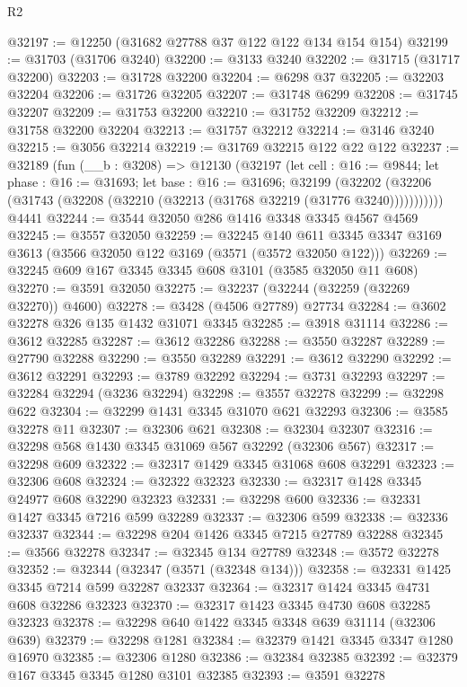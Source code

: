 \begin{lexlean}{R2}
\begin{coremodule}
@32197 := @12250 (@31682 @27788 @37 @122 @122 @134 @154 @154)
@32199 := @31703 (@31706 @3240)
@32200 := @3133 @3240
@32202 := @31715 (@31717 @32200)
@32203 := @31728 @32200
@32204 := @6298 @37
@32205 := @32203 @32204
@32206 := @31726 @32205
@32207 := @31748 @6299
@32208 := @31745 @32207
@32209 := @31753 @32200
@32210 := @31752 @32209
@32212 := @31758 @32200 @32204
@32213 := @31757 @32212
@32214 := @3146 @3240
@32215 := @3056 @32214
@32219 := @31769 @32215 @122 @22 @122
@32237 := @32189
    (fun (__b : @3208) =>
    @12130
      (@32197
        (let cell : @16 := @9844;
        let phase : @16 := @31693;
        let base : @16 := @31696;
        @32199
          (@32202 (@32206 (@31743 (@32208 (@32210 (@32213 (@31768 @32219 (@31776 @3240)))))))))))
    @4441
@32244 := @3544 @32050 @286 @1416 @3348 @3345 @4567 @4569
@32245 := @3557 @32050
@32259 := @32245
    @140
    @611
    @3345
    @3347
    @3169
    @3613
    (@3566 @32050 @122 @3169 (@3571 (@3572 @32050 @122)))
@32269 := @32245 @609 @167 @3345 @3345 @608 @3101 (@3585 @32050 @11 @608)
@32270 := @3591 @32050
@32275 := @32237 (@32244 (@32259 (@32269 @32270)) @4600)
@32278 := @3428 (@4506 @27789) @27734
@32284 := @3602 @32278 @326 @135 @1432 @31071 @3345
@32285 := @3918 @31114
@32286 := @3612 @32285
@32287 := @3612 @32286
@32288 := @3550 @32287
@32289 := @27790 @32288
@32290 := @3550 @32289
@32291 := @3612 @32290
@32292 := @3612 @32291
@32293 := @3789 @32292
@32294 := @3731 @32293
@32297 := @32284 @32294 (@3236 @32294)
@32298 := @3557 @32278
@32299 := @32298 @622
@32304 := @32299 @1431 @3345 @31070 @621 @32293
@32306 := @3585 @32278 @11
@32307 := @32306 @621
@32308 := @32304 @32307
@32316 := @32298 @568 @1430 @3345 @31069 @567 @32292 (@32306 @567)
@32317 := @32298 @609
@32322 := @32317 @1429 @3345 @31068 @608 @32291
@32323 := @32306 @608
@32324 := @32322 @32323
@32330 := @32317 @1428 @3345 @24977 @608 @32290 @32323
@32331 := @32298 @600
@32336 := @32331 @1427 @3345 @7216 @599 @32289
@32337 := @32306 @599
@32338 := @32336 @32337
@32344 := @32298 @204 @1426 @3345 @7215 @27789 @32288
@32345 := @3566 @32278
@32347 := @32345 @134 @27789
@32348 := @3572 @32278
@32352 := @32344 (@32347 (@3571 (@32348 @134)))
@32358 := @32331 @1425 @3345 @7214 @599 @32287 @32337
@32364 := @32317 @1424 @3345 @4731 @608 @32286 @32323
@32370 := @32317 @1423 @3345 @4730 @608 @32285 @32323
@32378 := @32298 @640 @1422 @3345 @3348 @639 @31114 (@32306 @639)
@32379 := @32298 @1281
@32384 := @32379 @1421 @3345 @3347 @1280 @16970
@32385 := @32306 @1280
@32386 := @32384 @32385
@32392 := @32379 @167 @3345 @3345 @1280 @3101 @32385
@32393 := @3591 @32278

\end{coremodule}
\end{lexlean}
